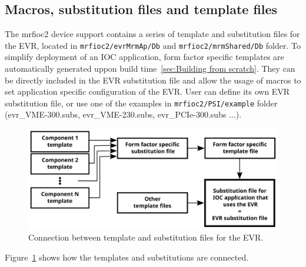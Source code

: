 \documentclass[12pt,a4paper]{article}
\begin{document}
\subsection{Macros, substitution files and template files}\label{sec:Macros}
The mrfioc2 device support contains a series of template and substitution files for the EVR, located in \texttt{mrfioc2/evrMrmAp/Db} and \texttt{mrfioc2/mrmShared/Db} folder. To simplify deployment of an IOC application, form factor specific templates are automatically generated uppon build time~\ref{sec:Building from scratch}. They can be directly included in the EVR substitution file and allow the usage of macros to set application specific configuration of the EVR. User can define its own EVR substitution file, or use one of the examples in \texttt{mrfioc2/PSI/example} folder (evr\_VME-300.subs, evr\_VME-230.subs, evr\_PCIe-300.subs ...).
\begin{figure}[H]
	\centering
	\includegraphics[width=\columnwidth]{./img/templates}
	\caption{Connection between template and substitution files for the EVR.}
	\label{fig:templates}
\end{figure}
Figure~\ref{fig:templates} shows how the templates and substitutions are connected.
\end{document}
